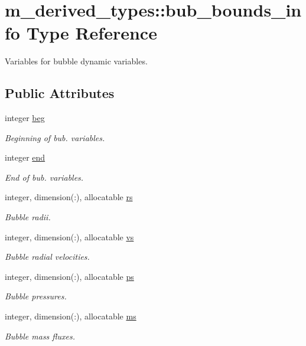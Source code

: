 \hypertarget{structm__derived__types_1_1bub__bounds__info}{}\section{m\+\_\+derived\+\_\+types\+:\+:bub\+\_\+bounds\+\_\+info Type Reference}
\label{structm__derived__types_1_1bub__bounds__info}


Variables for bubble dynamic variables.  


\subsection*{Public Attributes}
\begin{DoxyCompactItemize}
\item 
integer \hyperlink{structm__derived__types_1_1bub__bounds__info_af1cd7c7f30de05a0f9ee49f5d23ef354}{beg}
\begin{DoxyCompactList}\small\item\em Beginning of bub. variables. \end{DoxyCompactList}\item 
integer \hyperlink{structm__derived__types_1_1bub__bounds__info_a01730fa85d33e3174561ad5182d2e052}{end}
\begin{DoxyCompactList}\small\item\em End of bub. variables. \end{DoxyCompactList}\item 
integer, dimension(\+:), allocatable \hyperlink{structm__derived__types_1_1bub__bounds__info_aa3a7d88d4bc7e857c54d3e7b09784f85}{rs}
\begin{DoxyCompactList}\small\item\em Bubble radii. \end{DoxyCompactList}\item 
integer, dimension(\+:), allocatable \hyperlink{structm__derived__types_1_1bub__bounds__info_aafe6965d5ebb0a946bda443cfdd6b840}{vs}
\begin{DoxyCompactList}\small\item\em Bubble radial velocities. \end{DoxyCompactList}\item 
integer, dimension(\+:), allocatable \hyperlink{structm__derived__types_1_1bub__bounds__info_a6bed3e7dc94afeeb61216758ecf733dd}{ps}
\begin{DoxyCompactList}\small\item\em Bubble pressures. \end{DoxyCompactList}\item 
integer, dimension(\+:), allocatable \hyperlink{structm__derived__types_1_1bub__bounds__info_a0aeed04f8b8072c124ed2cec4e23e78c}{ms}
\begin{DoxyCompactList}\small\item\em Bubble mass fluxes. \end{DoxyCompactList}\end{DoxyCompactItemize}



